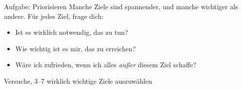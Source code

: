 \begin{frame}[c]
    \begin{block}{Aufgabe: Priorisieren}
    Manche Ziele sind spannender, und manche wichtiger als andere. Für jedes
    Ziel, frage dich:
    \begin{itemize}
        \item Ist es wirklich notwendig, das zu tun?
        \item Wie wichtig ist es mir, das zu erreichen?
        \item Wäre ich zufrieden, wenn ich alles {\em außer} diesem Ziel schaffe?
    \end{itemize} \pause
    Versuche, 3–7 wirklich wichtige Ziele auszuwählen
    \end{block}
\end{frame}

\fpause
